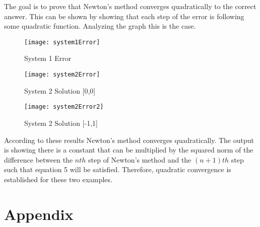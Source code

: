 \documentclass[]{article}
\begin{document}
The goal is to prove that Newton's method converges quadratically to the correct answer. This can be shown by showing that each step of the error is following some quadratic function. Analyzing the graph this is the case. 

\begin{figure}[H]
	\centering
	\texttt{[image: system1Error]}
	\caption{System 1 Error}
\end{figure}

\begin{figure}[H]
	\centering
	\texttt{[image: system2Error]}\caption{System 2 Solution [0,0]}
\end{figure}

\begin{figure}[H]
	\centering
	\texttt{[image: system2Error2]}
	\caption{System 2 Solution [-1,1]}
\end{figure}
According to these results Newton's method converges quadratically. The output is showing there is a constant that can be multiplied by the squared norm of the difference between the $ nth $ step of Newton's method and the $ (n+1)th $ step such that equation 5 will be satisfied. Therefore, quadratic convergence is established for these two examples. 

\section*{Appendix}


	
	
		










\end{document}
